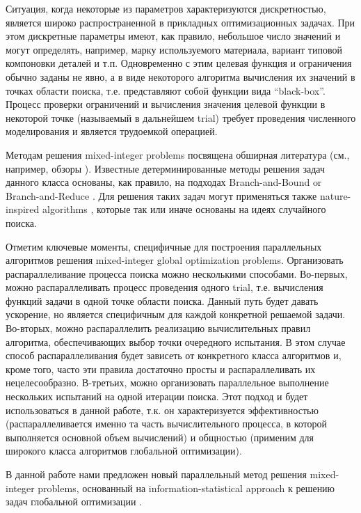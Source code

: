 \documentclass[
11pt,%
tightenlines,%
twoside,%
onecolumn,%
nofloats,%
nobibnotes,%
nofootinbib,%
superscriptaddress,%
noshowpacs,%
centertags]%
{revtex4}
\begin{document}
Ситуация, когда некоторые из параметров характеризуются дискретностью, является широко распространенной в прикладных оптимизационных задачах. При этом дискретные параметры имеют, как правило, небольшое число значений и могут определять, например, марку используемого материала, вариант типовой компоновки деталей и т.п. 
Одновременно с этим целевая функция и ограничения обычно заданы не явно, а в виде некоторого алгоритма вычисления их значений в точках области поиска, т.е. представляют собой функции вида “black-box”. Процесс проверки ограничений и вычисления значения целевой функции в некоторой точке (называемый в дальнейшем trial) требует проведения численного моделирования и является трудоемкой операцией. 

Методам решения mixed-integer problems посвящена обширная литература (см., например, обзоры \cite{Burer,Boukouvala}). Известные детерминированные методы решения задач данного класса основаны, как правило, на подходах Branch-and-Bound \cite{Belotti} or Branch-and-Reduce \cite{Vigerske}. Для решения таких задач могут применяться также nature-inspired algorithms \cite{Deep,Schluter}, которые так или иначе основаны на идеях случайного поиска.

Отметим ключевые моменты, специфичные для построения параллельных алгоритмов решения mixed-integer global optimization problems. Организовать распараллеливание процесса поиска можно несколькими способами.
Во-первых, можно распараллеливать процесс проведения одного trial, т.е. вычисления функций задачи в одной точке области поиска. Данный путь будет давать ускорение, но является специфичным для каждой конкретной решаемой задачи.
Во-вторых, можно распараллелить реализацию вычислительных правил алгоритма, обеспечивающих выбор точки очередного испытания. В этом случае способ распараллеливания будет зависеть от конкретного класса алгоритмов и, кроме того, часто эти правила достаточно просты и распараллеливать их нецелесообразно.
В-третьих, можно организовать параллельное выполнение нескольких испытаний на одной итерации поиска. Этот подход и будет использоваться в данной работе, т.к. он характеризуется эффективностью (распараллеливается именно та часть вычислительного процесса, в которой выполняется основной объем вычислений) и общностью (применим для широкого класса алгоритмов глобальной оптимизации).

В данной работе нами предложен новый параллельный метод решения mixed-integer problems, основанный на information-statistical approach к решению задач глобальной оптимизации \cite{Strongin2000,Strongin2013}. 
\end{document}

